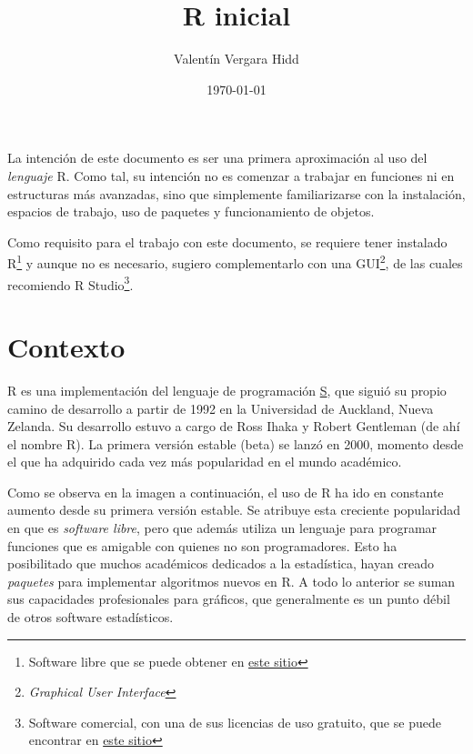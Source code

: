 \documentclass[letterpaper,11pt]{article}
\title{R inicial}
\author{Valentín Vergara Hidd}
\date{\today}
\begin{document}

\maketitle


La intención de este documento es ser una primera aproximación al uso del \emph{lenguaje} R. Como tal, su intención no es comenzar a trabajar en funciones ni en estructuras más avanzadas, sino que simplemente familiarizarse con la instalación, espacios de trabajo, uso de paquetes y funcionamiento de objetos. 

Como requisito para el trabajo con este documento, se requiere tener instalado R\footnote{Software libre que se puede obtener en \href{https://www.r-project.org/}{este sitio}} y aunque no es necesario, sugiero complementarlo con una GUI\footnote{\emph{Graphical User Interface}}, de las cuales recomiendo R Studio\footnote{Software comercial, con una de sus licencias de uso gratuito, que se puede encontrar en \href{https://www.rstudio.com/}{este sitio}}.

\section{Contexto}
R es una implementación del lenguaje de programación \href{http://ect.bell-labs.com/sl/S/}{S}, que siguió su propio camino de desarrollo a partir de 1992 en la Universidad de Auckland, Nueva Zelanda. Su desarrollo estuvo a cargo de Ross Ihaka y Robert Gentleman (de ahí el nombre R). La primera versión estable (beta) se lanzó en 2000, momento desde el que ha adquirido cada vez más popularidad en el mundo académico.

Como se observa en la imagen a continuación, el uso de R ha ido en constante aumento desde su primera versión estable. Se atribuye esta creciente popularidad en que es \emph{software libre}, pero que además utiliza un lenguaje para programar funciones que es amigable con quienes no son programadores. Esto ha posibilitado que muchos académicos dedicados a la estadística, hayan creado \emph{paquetes} para implementar algoritmos nuevos en R. A todo lo anterior se suman sus capacidades profesionales para gráficos, que generalmente es un punto débil de otros software estadísticos. 
\end{document}
